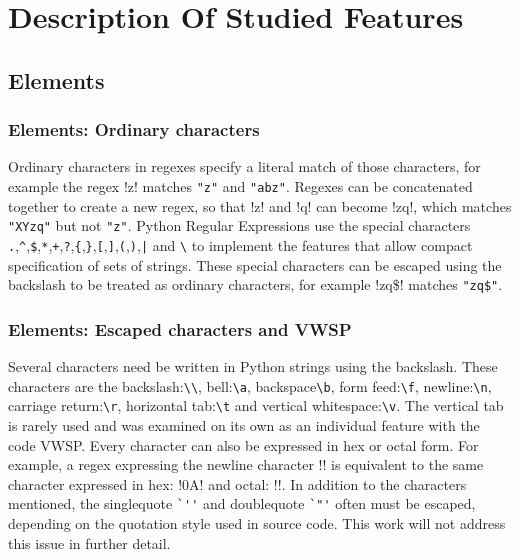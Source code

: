 \section*{Description Of Studied Features}
\label{app:featureDescriptions}

\subsection*{Elements}

\subsubsection*{Elements: Ordinary characters}

Ordinary characters in regexes specify a literal match of those characters, for example the regex \cverb!z! matches \verb!"z"! and \verb!"abz"!.  Regexes can be concatenated together to create a new regex, so that \cverb!z! and \cverb!q! can become \cverb!zq!, which matches \verb!"XYzq"! but not \verb!"z"!.  Python Regular Expressions use the special characters \verb!.!,\verb!^!,\verb!$!,\verb!*!,\verb!+!,\verb!?!,\verb!{!,\verb!}!,\verb![!,\verb!]!,\verb!(!,\verb!)!,\verb!|! and \verb!\! to implement the features that allow compact specification of sets of strings.  These special characters can be escaped using the backslash to be treated as ordinary characters, for example \cverb!zq\$! matches \verb!"zq$"!.

\subsubsection*{Elements: Escaped characters and VWSP}

Several characters need be written in Python strings using the backslash.  These characters are the backslash:\verb!\\!, bell:\verb!\a!, backspace\verb!\b!, form feed:\verb!\f!, newline:\verb!\n!, carriage return:\verb!\r!, horizontal tab:\verb!\t! and vertical whitespace:\verb!\v!.  The vertical tab is rarely used and was examined on its own as an individual feature with the code VWSP.  Every character can also be expressed in hex or octal form.  For example, a regex expressing the newline character \cverb!\n! is equivalent to the same character expressed in hex: \cverb!\x0A! and octal: \cverb!!.  In addition to the characters mentioned, the singlequote \verb!`''! and doublequote \verb!`"'! often must be escaped, depending on the quotation style used in source code.  This work will not address this issue in further detail.

